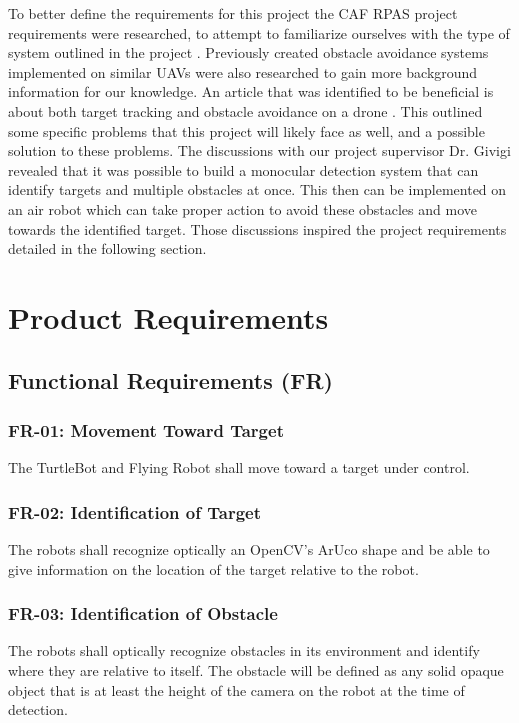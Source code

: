 \documentclass{article}
\begin{document}
	To better define the requirements for this project the CAF RPAS project requirements were researched, to attempt to familiarize ourselves with the type of system outlined in the project \cite{RPAS}. Previously created obstacle avoidance systems implemented on similar UAVs were also researched to gain more background information for our knowledge. An article that was identified to be beneficial is about both target tracking and obstacle avoidance on a drone \cite{woods2015dynamic}. This outlined some specific problems that this project will likely face as well, and a possible solution to these problems. 
	The discussions with our project supervisor Dr. Givigi revealed that it was possible to build a monocular detection system that can identify targets and multiple obstacles at once. This then can be implemented on an air robot which can take proper action to avoid these obstacles and move towards the identified target. Those discussions inspired the project requirements detailed in the following section.

\section{Product Requirements}

	\subsection{Functional Requirements (FR)}
		
		\subsubsection{FR-01: Movement Toward Target}
		The TurtleBot and Flying Robot shall move toward a target under control.
		
		\subsubsection{FR-02: Identification of Target}
		The robots shall recognize optically an OpenCV's ArUco shape and be able to give information on the location of the target relative to the robot. 

		\subsubsection{FR-03: Identification of Obstacle}
		The robots shall optically recognize obstacles in its environment and identify where they are relative to itself. The obstacle will be defined as any solid opaque object that is at least the height of the camera on the robot at the time of detection.
		
\end{document}
